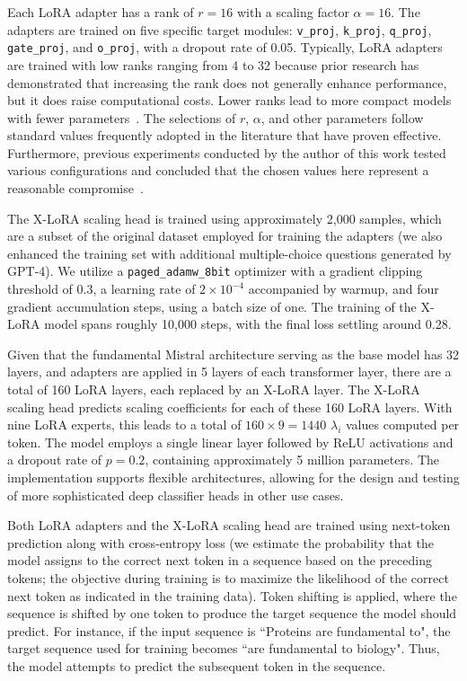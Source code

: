 Each LoRA adapter has a rank of $r=16$ with a scaling factor $\alpha=16$. The adapters are trained on five specific target modules: \texttt{v\_proj}, \texttt{k\_proj}, \texttt{q\_proj}, \texttt{gate\_proj}, and \texttt{o\_proj}, with a dropout rate of 0.05. Typically, LoRA adapters are trained with low ranks ranging from 4 to 32 because prior research has demonstrated that increasing the rank does not generally enhance performance, but it does raise computational costs. Lower ranks lead to more compact models with fewer parameters~\cite{hu2021lora}. The selections of $r$, $\alpha$, and other parameters follow standard values frequently adopted in the literature that have proven effective. Furthermore, previous experiments conducted by the author of this work tested various configurations and concluded that the chosen values here represent a reasonable compromise~\cite{Luu2023BioinspiredLLM:Materials}.

The X-LoRA scaling head is trained using approximately 2,000 samples, which are a subset of the original dataset employed for training the adapters (we also enhanced the training set with additional multiple-choice questions generated by GPT-4). We utilize a \texttt{paged\_adamw\_8bit} optimizer with a gradient clipping threshold of 0.3, a learning rate of $2 \times 10^{-4}$ accompanied by warmup, and four gradient accumulation steps, using a batch size of one. The training of the X-LoRA model spans roughly 10,000 steps, with the final loss settling around 0.28.

Given that the fundamental Mistral architecture serving as the base model has 32 layers, and adapters are applied in 5 layers of each transformer layer, there are a total of 160 LoRA layers, each replaced by an X-LoRA layer. The X-LoRA scaling head predicts scaling coefficients for each of these 160 LoRA layers. With nine LoRA experts, this leads to a total of $160 \times 9 = 1440$ $\lambda_i$ values computed per token. The model employs a single linear layer followed by ReLU activations and a dropout rate of $p=0.2$, containing approximately 5 million parameters. The implementation supports flexible architectures, allowing for the design and testing of more sophisticated deep classifier heads in other use cases.

Both LoRA adapters and the X-LoRA scaling head are trained using next-token prediction along with cross-entropy loss (we estimate the probability that the model assigns to the correct next token in a sequence based on the preceding tokens; the objective during training is to maximize the likelihood of the correct next token as indicated in the training data). Token shifting is applied, where the sequence is shifted by one token to produce the target sequence the model should predict. For instance, if the input sequence is ``Proteins are fundamental to", the target sequence used for training becomes ``are fundamental to biology". Thus, the model attempts to predict the subsequent token in the sequence.

